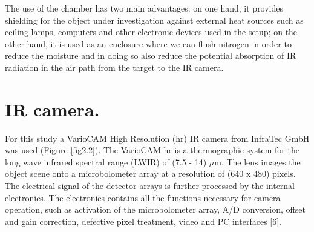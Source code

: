 		The use of the chamber has two main advantages: on one hand, it provides shielding for the object under investigation against external heat sources such as ceiling lamps, computers and other electronic devices used in the setup; on the other hand, it is used as an enclosure where we can flush nitrogen in order to reduce the moisture and in doing so also reduce the potential absorption of IR radiation in the air path from the target to the IR camera.
		
	\section{IR camera.}\label{section2.2}
	
		For this study a VarioCAM High Resolution (hr) IR camera from InfraTec GmbH was used (Figure \ref{fig2.2}). The VarioCAM \textregistered\space hr is a thermographic system for the long wave infrared spectral range (LWIR) of (7.5 - 14) $\mu$m. The lens images the object scene onto a microbolometer array at a resolution of (640 x 480) pixels. The electrical signal of the detector arrays is further processed by the internal electronics. The electronics contains all the functions necessary for camera operation, such as activation of the microbolometer array, A/D conversion, offset and gain correction, defective pixel treatment, video and PC interfaces [6].
		
